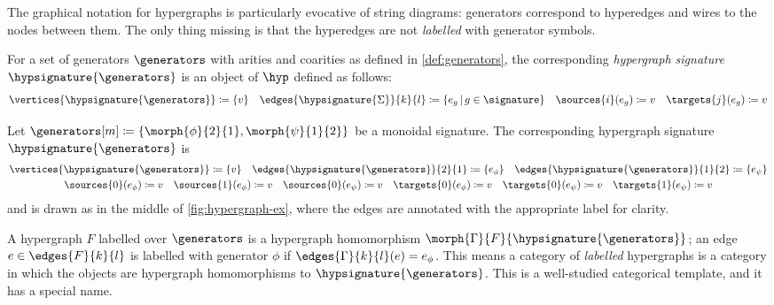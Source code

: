 The graphical notation for hypergraphs is particularly evocative of string
diagrams: generators
correspond to hyperedges and wires to the nodes between them.
The only thing missing is that the hyperedges are not \emph{labelled} with
generator symbols.

\begin{definition}
    For a set of generators \(\generators\) with arities and coarities as defined
    in \cref{def:generators}, the corresponding \emph{hypergraph signature}
    \(\hypsignature{\generators}\) is an object of \(\hyp\) defined as follows:
    \begin{gather*}
        \vertices{\hypsignature{\generators}}
        \coloneqq
        \{ v \}
        \quad
        \edges{\hypsignature{\Sigma}}{k}{l}
        \coloneqq
        \{ e_g \,|\, g \in \signature\}
        \quad
        \sources{i}(e_g) \coloneqq v
        \quad
        \targets{j}(e_g) \coloneqq v
    \end{gather*}
\end{definition}

\begin{example}\label{ex:labelled-hypergraph-signature}
    Let \(\generators[m] \coloneqq \{\morph{\phi}{2}{1}, \morph{\psi}{1}{2}\}\)
    be a monoidal signature.
    The corresponding hypergraph signature \(\hypsignature{\generators}\) is
    \begin{gather*}
        \vertices{\hypsignature{\generators}} \coloneqq \{v\}
        \quad
        \edges{\hypsignature{\generators}}{2}{1} \coloneqq \{e_\phi\}
        \quad
        \edges{\hypsignature{\generators}}{1}{2} \coloneqq \{e_\psi\}
        \\
        \sources{0}(e_\phi) \coloneqq v
        \quad
        \sources{1}(e_\phi) \coloneqq v
        \quad
        \sources{0}(e_\psi) \coloneqq v
        \quad
        \targets{0}(e_\phi) \coloneqq v
        \quad
        \targets{0}(e_\psi) \coloneqq v
        \quad
        \targets{1}(e_\psi) \coloneqq v
    \end{gather*}
    and is drawn as in the middle of \cref{fig:hypergraph-ex}, where the edges
    are annotated with the appropriate label for clarity.
\end{example}

A hypergraph \(F\) labelled over \(\generators\) is a hypergraph homomorphism
\(\morph{\Gamma}{F}{\hypsignature{\generators}}\);
an edge \(e \in \edges{F}{k}{l}\) is labelled with generator
\(\phi\) if \(\edges{\Gamma}{k}{l}(e) = e_\phi\).
This means a category of \emph{labelled} hypergraphs is a category in which the
objects are hypergraph homomorphisms to \(\hypsignature{\generators}\).
This is a well-studied categorical template, and it has a special name.

